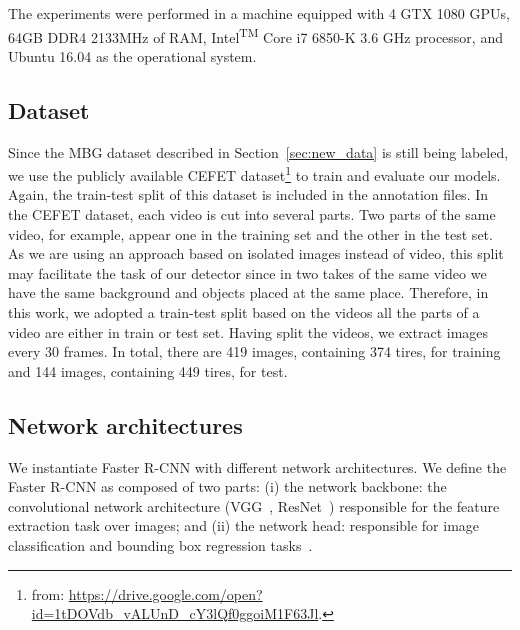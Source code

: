 The experiments were performed in a machine equipped with 4 GTX 1080 GPUs, 64GB DDR4 2133MHz of RAM, Intel\textsuperscript{TM} Core i7 6850-K 3.6 GHz processor, and Ubuntu 16.04 as the operational system.


\subsection{Dataset}
%
Since the MBG dataset described in Section~\ref{sec:new_data} is still being labeled, we use the publicly available CEFET dataset\footnote{from: \url{https://drive.google.com/open?id=1tDOVdb_vALUnD_cY3lQf0ggoiM1F63Jl}.} to train and evaluate our models.
Again, the train-test split of this dataset is included in the annotation files.
In the CEFET dataset, each video is cut into several parts.
Two parts of the same video, for example, appear one in the training set and the other in the test set.
As we are using an approach based on isolated images instead of video, this split may facilitate the task of our detector since in two takes of the same video we have the same background and objects placed at the same place.
%
Therefore, in this work, we adopted a train-test split based on the videos \ie all the parts of a video are either in train or test set.
Having split the videos, we extract images every 30 frames.
In total, there are 419 images, containing 374 tires,  for training and 144 images, containing 449 tires,  for test.



%
\subsection{Network architectures}
We instantiate Faster R-CNN with different network architectures.
We define the Faster R-CNN as composed of two parts:
(i) the network backbone: the convolutional network architecture (\eg VGG~\cite{Simonyan2015VGG}, ResNet~\cite{He2016deep}) responsible for the feature extraction task over images; and
(ii) the network head: responsible for image classification and bounding box regression tasks~\cite{He2017mask}.

